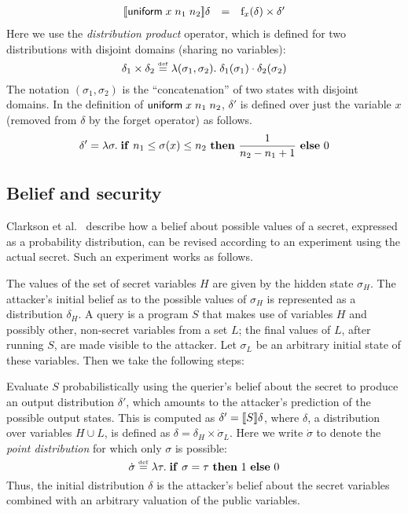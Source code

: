 $$
\begin{array}{rcl}
[\![{\mathsf{uniform}\;{x}\;{n_1}\;n_2}]\!]{\delta} & = &
\mathrm{f}_{x}(\delta) \times \delta'
\end{array}
$$
Here we use the \emph{distribution product} operator, which is defined
for two distributions with disjoint domains (sharing no variables):
 $$ \delta_1 \times \delta_2 \stackrel{\smash{\scriptscriptstyle \mathrm{def}}}= \lambda(\sigma_1, \sigma_2) . \;
\delta_1(\sigma_1) \cdot \delta_2(\sigma_2) $$ The notation
$(\sigma_1,\sigma_2)$ is the ``concatenation'' of two states with
disjoint domains. In the definition of $\mathsf{uniform}\;{x}\;{n_1}\;n_2$, $ \delta' $ is
defined over just the variable $ x $ (removed from $\delta$ by the
forget operator) as follows.
$$ \delta ' = \lambda \sigma . \; \text{\textbf{if} } n_1 \leq \sigma(x) \leq n_2 \text{ \textbf{then} }
\frac{1}{n_2-n_1+1} \text{ \textbf{else} } 0 $$

\subsection{Belief and security}
\label{sec:experiment}

Clarkson et al.~\cite{clarkson09quantifying} describe how a belief
about possible values of a secret, expressed as a probability
distribution, can be revised according to an experiment using the
actual secret.  Such an experiment works as follows.

The values of the set of secret variables $ H $ are given by the hidden
state $\sigma_H$.  The attacker's initial belief as to the possible
values of $\sigma_H$ is represented as a distribution $ \delta_H $.  A
query is a program $ S $ that makes use of variables $ H $ and
possibly other, non-secret variables from a set $L$; the final values
of $L$, after running $S$, are made visible to the attacker.  Let
$\sigma_L$ be an arbitrary initial state of these variables.  Then we
take the following steps: 

 Evaluate $S$ probabilistically using the
querier's belief about the secret to produce an output distribution
$\delta'$, which amounts to the attacker's prediction of the possible
output states.  This is computed as $\delta' = [\![{S}]\!]{\delta} $,
where $\delta$, a distribution over variables $ H \cup L $, is defined as $ \delta =
\delta_H \times \dot{\sigma}_L $.  
Here we write $ \dot{\sigma} $ to denote the \emph{point distribution}
for which only $\sigma$ is possible:
$$ \dot{\sigma} \stackrel{\smash{\scriptscriptstyle \mathrm{def}}}= \lambda \tau . \; \text{\textbf{if} } \sigma = \tau \text{ \textbf{then} } 1 \text{ \textbf{else} }
0 $$ Thus, the initial distribution $\delta$ is the attacker's belief about the
secret variables combined with an arbitrary valuation of the
public variables.

